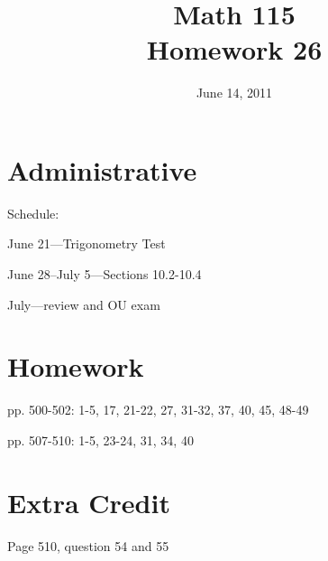 \documentclass[fleqn,addpoints]{exam}
\title{Math 115 \\ Homework 26}
\date{June 14, 2011}
\begin{document}
\maketitle



\ifprintanswers
\else

\section{Administrative}

Schedule:
\begin{itemize*}
  \item June 21---Trigonometry Test
  \item June 28--July 5---Sections 10.2-10.4
  \item July---review and OU exam
\end{itemize*}

\fi

\section{Homework}
\begin{itemize*}
  \item pp. 500-502: 1-5, 17, 21-22, 27, 31-32, 37, 40, 45, 48-49
  \item pp. 507-510: 1-5, 23-24, 31, 34, 40
\end{itemize*}

\section{Extra Credit}
Page 510, question 54 and 55
\end{document}
